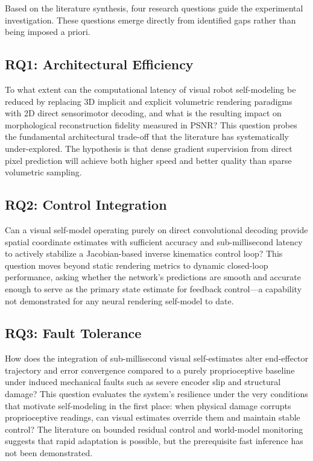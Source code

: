 ﻿\documentclass[12pt,a4paper,oneside]{report}
\begin{document}
Based on the literature synthesis, four research questions guide the experimental investigation. These questions emerge directly from identified gaps rather than being imposed a priori.

\subsection{RQ1: Architectural Efficiency}

To what extent can the computational latency of visual robot self-modeling be reduced by replacing 3D implicit and explicit volumetric rendering paradigms with 2D direct sensorimotor decoding, and what is the resulting impact on morphological reconstruction fidelity measured in PSNR? This question probes the fundamental architectural trade-off that the literature has systematically under-explored. The hypothesis is that dense gradient supervision from direct pixel prediction will achieve both higher speed and better quality than sparse volumetric sampling.

\subsection{RQ2: Control Integration}

Can a visual self-model operating purely on direct convolutional decoding provide spatial coordinate estimates with sufficient accuracy and sub-millisecond latency to actively stabilize a Jacobian-based inverse kinematics control loop? This question moves beyond static rendering metrics to dynamic closed-loop performance, asking whether the network's predictions are smooth and accurate enough to serve as the primary state estimate for feedback control---a capability not demonstrated for any neural rendering self-model to date.

\subsection{RQ3: Fault Tolerance}

How does the integration of sub-millisecond visual self-estimates alter end-effector trajectory and error convergence compared to a purely proprioceptive baseline under induced mechanical faults such as severe encoder slip and structural damage? This question evaluates the system's resilience under the very conditions that motivate self-modeling in the first place: when physical damage corrupts proprioceptive readings, can visual estimates override them and maintain stable control? The literature on bounded residual control and world-model monitoring suggests that rapid adaptation is possible, but the prerequisite fast inference has not been demonstrated.
\end{document}
